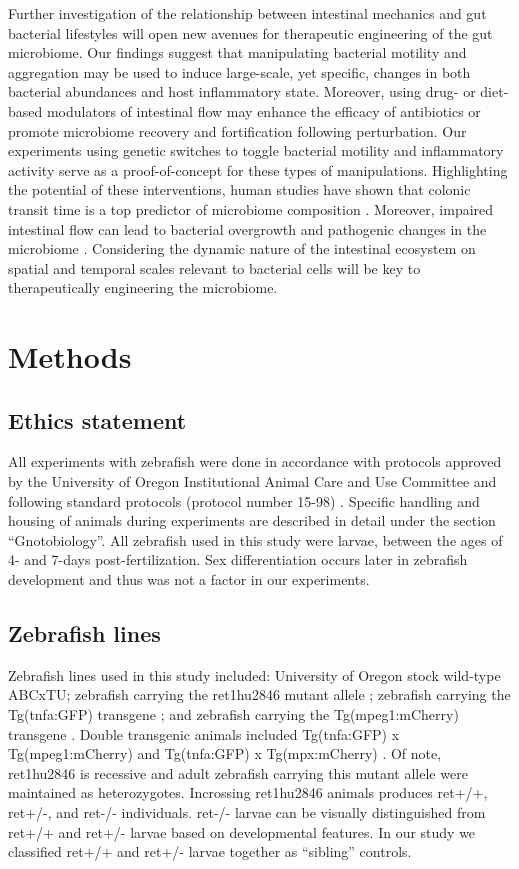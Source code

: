 {{{{{{{Further investigation of the relationship between intestinal mechanics and gut bacterial lifestyles will open new avenues for therapeutic engineering of the gut microbiome. Our findings suggest that manipulating bacterial motility and aggregation may be used to induce large-scale, yet specific, changes in both bacterial abundances and host inflammatory state. Moreover, using drug- or diet-based modulators of intestinal flow may enhance the efficacy of antibiotics or promote microbiome recovery and fortification following perturbation. Our experiments using genetic switches to toggle bacterial motility and inflammatory activity serve as a proof-of-concept for these types of manipulations. Highlighting the potential of these interventions, human studies have shown that colonic transit time is a top predictor of microbiome composition \cite{falony_population-level_2016,roager_colonic_2016}. Moreover, impaired intestinal flow can lead to bacterial overgrowth and pathogenic changes in the microbiome \cite{rolig_enteric_2017,heanue_enteric_2007,dukowicz_small_2007}. Considering the dynamic nature of the intestinal ecosystem on spatial and temporal scales relevant to bacterial cells will be key to therapeutically engineering the microbiome. 

\section{Methods}
\subsection{Ethics statement}
All experiments with zebrafish were done in accordance with protocols approved by the University of Oregon Institutional Animal Care and Use Committee and following standard protocols (protocol number 15-98) \cite{westerfield_zebrafish_2007}. Specific handling and housing of animals during experiments are described in detail under the section ``Gnotobiology''. All zebrafish used in this study were larvae, between the ages of 4- and 7-days post-fertilization. Sex differentiation occurs later in zebrafish development and thus was not a factor in our experiments.

\subsection{Zebrafish lines}
Zebrafish lines used in this study included: University of Oregon stock wild-type ABCxTU; zebrafish carrying the ret1hu2846 mutant allele \cite{wiles_host_2016,ganz_image_2018}; zebrafish carrying the Tg(tnfa:GFP) transgene \cite{marjoram_epigenetic_2015}; and zebrafish carrying the Tg(mpeg1:mCherry) transgene \cite{ellett_mpeg1_2011}. Double transgenic animals included Tg(tnfa:GFP) x Tg(mpeg1:mCherry) and Tg(tnfa:GFP) x Tg(mpx:mCherry) \cite{lam_heat_2013}. Of note, ret1hu2846 is recessive and adult zebrafish carrying this mutant allele were maintained as heterozygotes. Incrossing ret1hu2846 animals produces ret+/+, ret+/-, and ret-/- individuals. ret-/- larvae can be visually distinguished from ret+/+ and ret+/- larvae based on developmental features. In our study we classified ret+/+ and ret+/- larvae together as ``sibling'' controls. 

}}}}}}}

